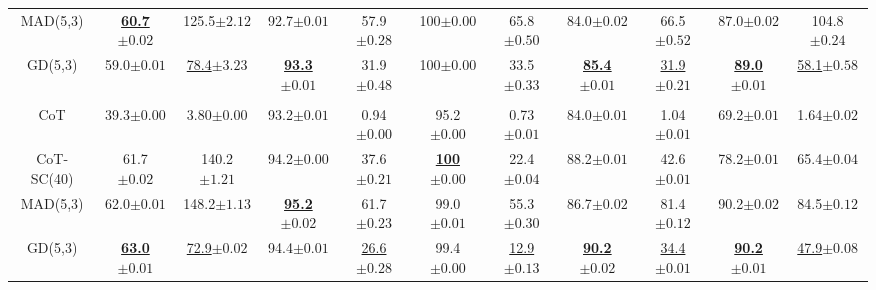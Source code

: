 \begin{table}[t]
{\begin{tabular}{ccccccccccc}
MAD(5,3)                 & \underline{\textbf{60.7}}\scriptsize{$\pm 0.02$} & 125.5\scriptsize{$\pm 2.12$}          & 92.7\scriptsize{$\pm 0.01$} & 57.9\scriptsize{$\pm 0.28$}        & 100\scriptsize{$\pm 0.00$} & 65.8\scriptsize{$\pm 0.50$}                & 84.0\scriptsize{$\pm 0.02$} & 66.5\scriptsize{$\pm 0.52$}         & 87.0\scriptsize{$\pm 0.02$} & 104.8\scriptsize{$\pm 0.24$}           \\ 
GD(5,3)                  & 59.0\scriptsize{$\pm 0.01$} & \underline{78.4}\scriptsize{$\pm 3.23$}           & \underline{\textbf{93.3}}\scriptsize{$\pm 0.01$} & 31.9\scriptsize{$\pm 0.48$}         & 100\scriptsize{$\pm 0.00$} & 33.5\scriptsize{$\pm 0.33$}                & \underline{\textbf{85.4}}\scriptsize{$\pm 0.01$} & \underline{31.9}\scriptsize{$\pm 0.21$}         & \underline{\textbf{89.0}}\scriptsize{$\pm 0.01$} & \underline{58.1}\scriptsize{$\pm 0.58$} \\
\rowcolor{Gray}
\multicolumn{11}{c}{\texttt{DeepSeek-R1}} 
\\
\midrule
CoT                      & 39.3\scriptsize{$\pm 0.00$} & 3.80\scriptsize{$\pm 0.00$}           & 93.2\scriptsize{$\pm 0.01$} & 0.94\scriptsize{$\pm 0.00$}         & 95.2\scriptsize{$\pm 0.00$} & 0.73\scriptsize{$\pm 0.01$}                & 84.0\scriptsize{$\pm 0.01$}  & 1.04\scriptsize{$\pm 0.01$}         & 69.2\scriptsize{$\pm 0.01$} & 1.64\scriptsize{$\pm 0.02$}           \\
CoT-SC(40)               & 61.7 \scriptsize{$\pm 0.02$} & 140.2 \scriptsize{$\pm 1.21$}          & 94.2\scriptsize{$\pm 0.00$}  & 37.6\scriptsize{$\pm 0.21$}         & \underline{\textbf{100}}\scriptsize{$\pm 0.00$}     & 22.4\scriptsize{$\pm 0.04$}                & 88.2\scriptsize{$\pm 0.01$} & 42.6\scriptsize{$\pm 0.01$}         & 78.2\scriptsize{$\pm 0.01$} & 65.4\scriptsize{$\pm 0.04$}           \\
MAD(5,3)                 & 62.0\scriptsize{$\pm 0.01$} & 148.2\scriptsize{$\pm 1.13$}          & \underline{\textbf{95.2}}\scriptsize{$\pm 0.02$} & 61.7\scriptsize{$\pm 0.23$}        & 99.0\scriptsize{$\pm 0.01$} & 55.3\scriptsize{$\pm 0.30$}                & 86.7\scriptsize{$\pm 0.02$} & 81.4\scriptsize{$\pm 0.12$}         & 90.2\scriptsize{$\pm 0.02$} & 84.5\scriptsize{$\pm 0.12$}           \\ 
GD(5,3)                  & \underline{\textbf{63.0}}\scriptsize{$\pm 0.01$} & \underline{72.9}\scriptsize{$\pm 0.02$}           & 94.4\scriptsize{$\pm 0.01$} & \underline{26.6}\scriptsize{$\pm 0.28$}         & 99.4\scriptsize{$\pm 0.00$} & \underline{12.9}\scriptsize{$\pm 0.13$}                & \underline{\textbf{90.2}}\scriptsize{$\pm 0.02$} & \underline{34.4}\scriptsize{$\pm 0.01$}         & \underline{\textbf{90.2}}\scriptsize{$\pm 0.01$} & \underline{47.9}\scriptsize{$\pm 0.08$} \\

\end{tabular}}
\end{table}
